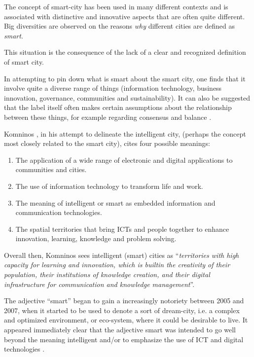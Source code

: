 The concept of smart-city has been used in many different contexts and is associated with distinctive and innovative aspects that are often quite different. Big diversities are observed on the reasons \textit{why} different cities are defined as \textit{smart}.

This situation is the consequence of the lack of a clear and recognized definition of smart city.

In attempting to pin down what is smart about the smart city, one finds that it involve quite a diverse range of things (information technology, business innovation, governance, communities and sustainability). It can also be suggested that the label itself often makes certain assumptions about the relationship between these things, for example regarding consensus and balance \cite{hollands_will_2008}.

Komninos \cite{komninos_intelligent_2002}, in his attempt to delineate the intelligent city, (perhaps the concept most closely related to the smart city), cites four possible meanings:

\begin{enumerate}
\item The application of a wide range of electronic and digital applications to communities and cities.
\item The use of information technology to transform life and work.
\item The meaning of intelligent or smart as embedded information and communication technologies.
\item The spatial territories that bring ICTs and people together to enhance innovation, learning, knowledge and problem solving.
\end{enumerate}

Overall then, Komninos \cite{komninos_intelligent_2002} sees intelligent (smart) cities as ``\textit{territories with high capacity for learning and innovation, which is built\textendash in the creativity of their population, their institutions of knowledge creation, and their digital infrastructure for communication and knowledge management}''.

The adjective ``smart'' began to gain a increasingly notoriety between 2005 and 2007, when it started to be used to denote a sort of dream-city, i.e. a complex and optimized environment, or eco-system, where it could be desirable to live. It appeared immediately clear that the adjective smart was intended to go well beyond the meaning intelligent and/or to emphasize the use of ICT and digital technologies \cite{giovannella_smart_2014-1}.


